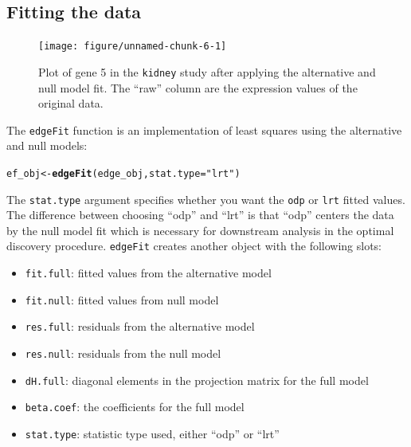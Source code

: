 \documentclass{article}\usepackage[]{graphicx}\usepackage[]{color}
\makeatletter
\newcommand{\hlstr}[1]{\textcolor[rgb]{0.192,0.494,0.8}{#1}}%
\newcommand{\hlstd}[1]{\textcolor[rgb]{0.345,0.345,0.345}{#1}}%
\newcommand{\hlkwb}[1]{\textcolor[rgb]{0.69,0.353,0.396}{#1}}%
\newcommand{\hlkwc}[1]{\textcolor[rgb]{0.333,0.667,0.333}{#1}}%
\newcommand{\hlkwd}[1]{\textcolor[rgb]{0.737,0.353,0.396}{\textbf{#1}}}%
\newenvironment{kframe}{%
 \def\at@end@of@kframe{}%
 \ifinner\ifhmode%
  \def\at@end@of@kframe{\end{minipage}}%
  \begin{minipage}{\columnwidth}%
 \fi\fi%
 \def\FrameCommand##1{\hskip\@totalleftmargin \hskip-\fboxsep
 \colorbox{shadecolor}{##1}\hskip-\fboxsep
     \hskip-\linewidth \hskip-\@totalleftmargin \hskip\columnwidth}%
 \MakeFramed {\advance\hsize-\width
   \@totalleftmargin\z@ \linewidth\hsize
   \@setminipage}}%
 {\par\unskip\endMakeFramed%
 \at@end@of@kframe}
\newenvironment{knitrout}{}{} %
\makeatother
\begin{document}
\subsection{Fitting the data}

\begin{figure}[t]
 \centering
\begin{knitrout}
\color{fgcolor}

{\centering \texttt{[image: figure/unnamed-chunk-6-1]} 

}



\end{knitrout}
\caption{Plot of gene 5 in the {\tt kidney} study after applying the alternative and null model fit. The ``raw'' column are the expression values of the original data.}
\label{fig:kplotFit}
\end{figure}

The {\tt edgeFit} function is an implementation of least squares using the alternative and null models:
\begin{knitrout}
\color{fgcolor}\begin{kframe}
\begin{alltt}
\hlstd{ef_obj} \hlkwb{<-} \hlkwd{edgeFit}\hlstd{(edge_obj,} \hlkwc{stat.type} \hlstd{=} \hlstr{"lrt"}\hlstd{)}
\end{alltt}
\end{kframe}
\end{knitrout}
The {\tt stat.type} argument specifies whether you want the {\tt odp} or {\tt lrt} fitted values. The difference between choosing ``odp'' and ``lrt'' is that ``odp'' centers the data by the null model fit which is necessary for downstream analysis in the optimal discovery procedure. {\tt edgeFit} creates another object with the following slots:
\begin{itemize}
\item {\tt fit.full}: fitted values from the alternative model
\item {\tt fit.null}: fitted values from null model
\item {\tt res.full}: residuals from the alternative model
\item {\tt res.null}: residuals from the null model
\item {\tt dH.full}: diagonal elements in the projection matrix for the full model
\item {\tt beta.coef}: the coefficients for the full model
\item {\tt stat.type}: statistic type used, either ``odp'' or ``lrt''
\end{itemize}
\end{document}
